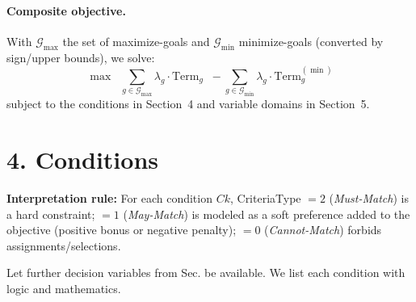 \documentclass[11pt,a4paper]{article}
\begin{document}
\paragraph{Composite objective.} With $\mathcal{G}_{\max}$ the set of maximize-goals and $\mathcal{G}_{\min}$ minimize-goals (converted by sign/upper bounds), we solve:
\[
\max \;\; \sum_{g\in\mathcal{G}_{\max}} \lambda_g \cdot \text{Term}_g \;\; - \sum_{g\in\mathcal{G}_{\min}} \lambda_g \cdot \text{Term}_g^{(\min)}
\]
subject to the conditions in Section~4 and variable domains in Section~5.

\section{4. Conditions}
\textbf{Interpretation rule:} For each condition $Ck$, CriteriaType $=2$ (\emph{Must-Match}) is a hard constraint; $=1$ (\emph{May-Match}) is modeled as a soft preference added to the objective (positive bonus or negative penalty); $=0$ (\emph{Cannot-Match}) forbids assignments/selections.

Let further decision variables from Sec. be available. We list each condition with logic and mathematics.
\end{document}
